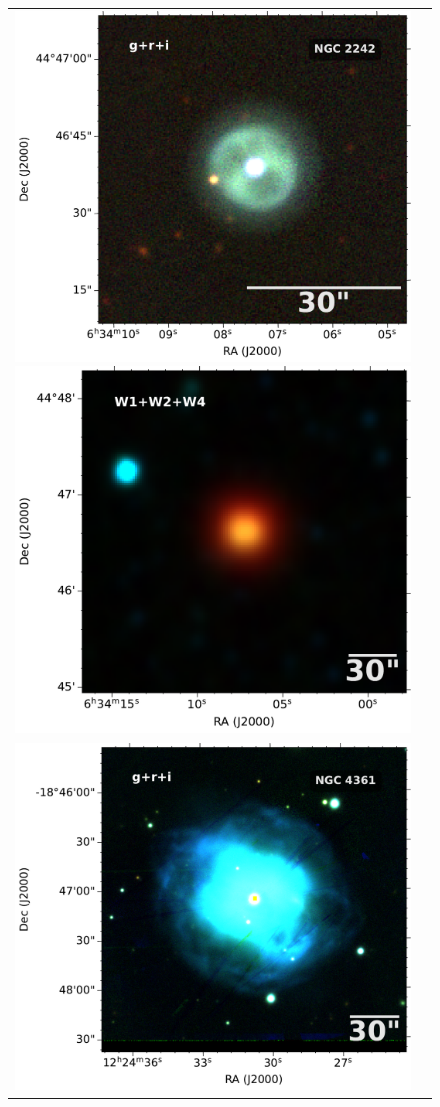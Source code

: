 \documentclass[fleqn,usenatbib]{mnras}
\begin{document}

\begin{figure}
  \centering
  \begin{tabular}{l l}
\includegraphics[width=0.52\linewidth]{Figs/cutout_rings.v3.skycell.2243.029.stk.i.unconv-irg-RGB.pdf}
\includegraphics[width=0.5\linewidth]{Figs/0979p454_ac51-w4-int-3_ra98.53061791727998_dec44.77716333248_asec200.000-421-RGB.pdf}\\
\includegraphics[width=0.52\linewidth]{Figs/cutout_rings.v3.skycell.0924.030.stk.i.unconv-irg-RGB.pdf}

\end{tabular}
\end{figure}
\end{document}
